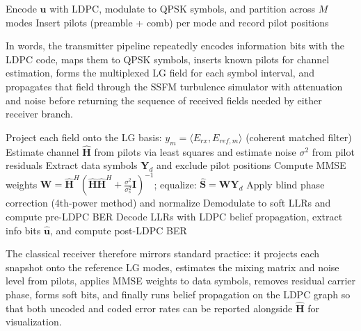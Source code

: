 \documentclass[journal]{IEEEtran}
\begin{document}
\begin{algorithm}[t]
\caption{OAM Transmitter Pipeline}
\label{alg:tx_pipeline}
Encode $\mathbf{u}$ with LDPC, modulate to QPSK symbols, and partition across $M$ modes\;
Insert pilots (preamble + comb) per mode and record pilot positions\;
\end{algorithm}

In words, the transmitter pipeline repeatedly encodes information bits with the LDPC code, maps them to QPSK symbols, inserts known pilots for channel estimation, forms the multiplexed LG field for each symbol interval, and propagates that field through the SSFM turbulence simulator with attenuation and noise before returning the sequence of received fields needed by either receiver branch.

\begin{algorithm}[t]
\caption{Classical MMSE+LDPC Receiver}
\label{alg:baseline_receiver}
Project each field onto the LG basis: $y_m = \langle E_{rx}, E_{ref,m} \rangle$ (coherent matched filter)\;
Estimate channel $\hat{\mathbf{H}}$ from pilots via least squares and estimate noise $\sigma^2$ from pilot residuals\;
Extract data symbols $\mathbf{Y}_d$ and exclude pilot positions\;
Compute MMSE weights $\mathbf{W} = \hat{\mathbf{H}}^H (\hat{\mathbf{H}}\hat{\mathbf{H}}^H + \frac{\sigma^2}{\sigma_s^2}\mathbf{I})^{-1}$; equalize: $\hat{\mathbf{S}} = \mathbf{W}\mathbf{Y}_d$\;
Apply blind phase correction (4th-power method) and normalize\;
Demodulate to soft LLRs and compute pre-LDPC BER\;
Decode LLRs with LDPC belief propagation, extract info bits $\hat{\mathbf{u}}$, and compute post-LDPC BER\;
\end{algorithm}

The classical receiver therefore mirrors standard practice: it projects each snapshot onto the reference LG modes, estimates the mixing matrix and noise level from pilots, applies MMSE weights to data symbols, removes residual carrier phase, forms soft bits, and finally runs belief propagation on the LDPC graph so that both uncoded and coded error rates can be reported alongside $\hat{\mathbf{H}}$ for visualization.
\end{document}
